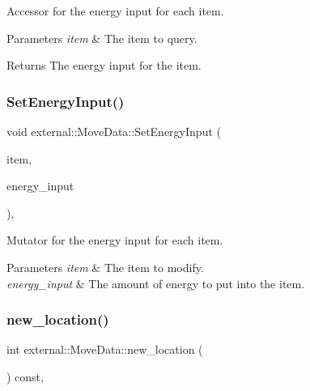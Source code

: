 Accessor for the energy input for each item. 


\begin{DoxyParams}{Parameters}
{\em item} & The item to query. \\
\hline
\end{DoxyParams}
\begin{DoxyReturn}{Returns}
The energy input for the item. 
\end{DoxyReturn}
\mbox{\label{classexternal_1_1_move_data_aba5ad33ec9f3e4632750e35236581096}} 
\subsubsection{\texorpdfstring{Set\+Energy\+Input()}{SetEnergyInput()}}
{\footnotesize\ttfamily void external\+::\+Move\+Data\+::\+Set\+Energy\+Input (\begin{DoxyParamCaption}\item[{Item\+Type}]{item,  }\item[{int}]{energy\+\_\+input }\end{DoxyParamCaption})\hspace{0.3cm}{\ttfamily [inline]}, {\ttfamily [noexcept]}}



Mutator for the energy input for each item. 


\begin{DoxyParams}{Parameters}
{\em item} & The item to modify. \\
\hline
{\em energy\+\_\+input} & The amount of energy to put into the item. \\
\hline
\end{DoxyParams}
\mbox{\label{classexternal_1_1_move_data_a2469eb5c4a210b6ebd769254f190ad7e}} 
\subsubsection{\texorpdfstring{new\+\_\+location()}{new\_location()}}
{\footnotesize\ttfamily int external\+::\+Move\+Data\+::new\+\_\+location (\begin{DoxyParamCaption}{ }\end{DoxyParamCaption}) const\hspace{0.3cm}{\ttfamily [inline]}, {\ttfamily [noexcept]}}



